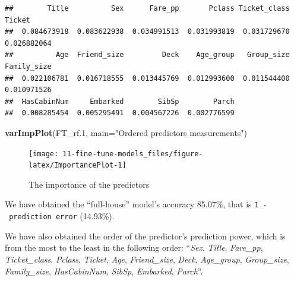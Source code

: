 \documentclass[
]{book}
\newenvironment{Shaded}{\begin{snugshade}}{\end{snugshade}}
\newcommand{\CommentTok}[1]{\textcolor[rgb]{0.56,0.35,0.01}{\textit{#1}}}
\newcommand{\DataTypeTok}[1]{\textcolor[rgb]{0.13,0.29,0.53}{#1}}
\newcommand{\DecValTok}[1]{\textcolor[rgb]{0.00,0.00,0.81}{#1}}
\newcommand{\FloatTok}[1]{\textcolor[rgb]{0.00,0.00,0.81}{#1}}
\newcommand{\KeywordTok}[1]{\textcolor[rgb]{0.13,0.29,0.53}{\textbf{#1}}}
\newcommand{\NormalTok}[1]{#1}
\newcommand{\OperatorTok}[1]{\textcolor[rgb]{0.81,0.36,0.00}{\textbf{#1}}}
\newcommand{\OtherTok}[1]{\textcolor[rgb]{0.56,0.35,0.01}{#1}}
\newcommand{\StringTok}[1]{\textcolor[rgb]{0.31,0.60,0.02}{#1}}
\begin{document}
\begin{Shaded}
\end{Shaded}

\begin{verbatim}
##        Title          Sex      Fare_pp       Pclass Ticket_class       Ticket 
##  0.084673918  0.083622938  0.034991513  0.031993819  0.031729670  0.026882064 
##          Age  Friend_size         Deck    Age_group   Group_size  Family_size 
##  0.022106781  0.016718555  0.013445769  0.012993600  0.011544400  0.010971526 
##  HasCabinNum     Embarked        SibSp        Parch 
##  0.008285454  0.005295491  0.004567226  0.002776599
\end{verbatim}

\begin{Shaded}
\begin{Highlighting}[]
\KeywordTok{varImpPlot}\NormalTok{(FT_rf}\FloatTok{.1}\NormalTok{, }\DataTypeTok{main=}\StringTok{"Ordered predictors measurements"}\NormalTok{)}
\end{Highlighting}
\end{Shaded}

\begin{figure}

{\centering \texttt{[image: 11-fine-tune-models\_files/figure-latex/ImportancePlot-1]} 

}

\caption{The importance of the predictors}\label{fig:ImportancePlot}
\end{figure}

We have obtained the ``full-house'' model's accuracy 85.07\%, that is \texttt{1\ -\ prediction\ error} (14.93\%).

We have also obtained the order of the predictor's prediction power, which is from the most to the least in the following order: ``\emph{Sex}, \emph{Title}, \emph{Fare\_pp}, \emph{Ticket\_class}, \emph{Pclass}, \emph{Ticket}, \emph{Age}, \emph{Friend\_size}, \emph{Deck}, \emph{Age\_group}, \emph{Group\_size}, \emph{Family\_size}, \emph{HasCabinNum}, \emph{SibSp}, \emph{Embarked}, \emph{Parch}''.
\end{document}
